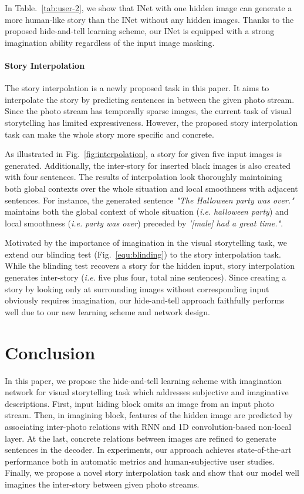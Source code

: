 \documentclass[letterpaper]{article} \usepackage{aaai20}  \usepackage{times}  \usepackage{helvet} \usepackage{courier}  \usepackage[hyphens]{url}  \usepackage{graphicx} \urlstyle{rm} \def\UrlFont{\rm}  \usepackage{graphicx}  \frenchspacing  \setlength{\pdfpagewidth}{8.5in}  \setlength{\pdfpageheight}{11in}
\newcommand{\figref}[1]{Fig.~\ref{#1}}
\newcommand{\tabref}[1]{Table.~\ref{#1}}
\newcommand{\ie}{{\it i.e. }}
\begin{document}
In \tabref{tab:user-2}, we show that INet with one hidden image can generate a more human-like story than the INet without any hidden images. Thanks to the proposed hide-and-tell learning scheme, our INet is equipped with a strong imagination ability regardless of the input image masking.


\paragraph{Story Interpolation}
\quad

\noindent
The story interpolation is a newly proposed task in this paper. It aims to interpolate the story by predicting sentences in between the given photo stream. Since the photo stream has temporally sparse images, the current task of visual storytelling has limited expressiveness. 
However, the proposed story interpolation task can make the whole story more specific and concrete.

As illustrated in \figref{fig:interpolation}, a story for given five input images is generated. Additionally, the inter-story for inserted black images is also created with four sentences. The results of interpolation look thoroughly maintaining both global contexts over the whole situation and local smoothness with adjacent sentences. For instance, the generated sentence \textit{"The Halloween party was over."} maintains both the global context of whole situation (\ie \textit{halloween party}) and local smoothness (\ie \textit{party was over}) preceded by \textit{'[male] had a great time."}. 

Motivated by the importance of imagination in the visual storytelling task, we extend our blinding test (\figref{equ:blinding}) to the story interpolation task. While the blinding test recovers a story for the hidden input, story interpolation generates inter-story (\ie five plus four, total nine sentences).
Since creating a story by looking only at surrounding images without corresponding input obviously requires imagination, our hide-and-tell approach faithfully performs well due to our new learning scheme and network design.



\section{Conclusion}
In this paper, we propose the hide-and-tell learning scheme with imagination network for visual storytelling task which addresses subjective and imaginative descriptions. First, input hiding block omits an image from an input photo stream. Then, in imagining block, features of the hidden image are predicted by associating inter-photo relations with RNN and 1D convolution-based non-local layer. At the last, concrete relations between images are refined to generate sentences in the decoder. In experiments, our approach achieves state-of-the-art performance both in automatic metrics and human-subjective user studies. Finally, we propose a novel story interpolation task and show that our model well imagines the inter-story between given photo streams. 


\clearpage



\end{document}
